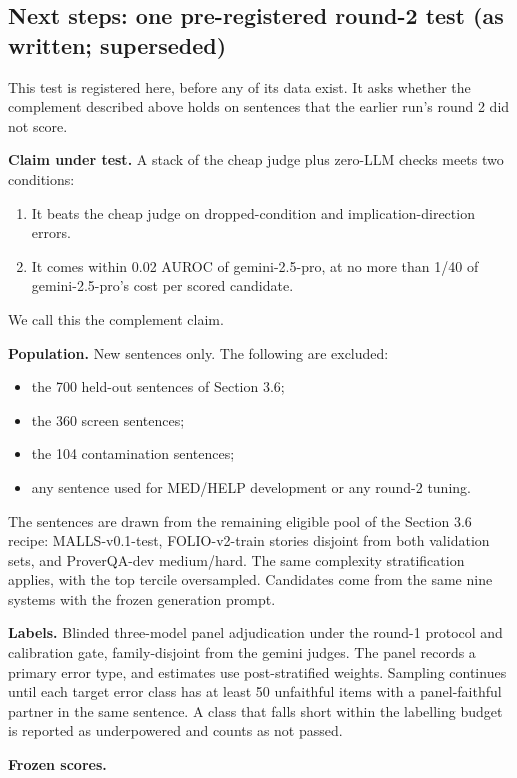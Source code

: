 \documentclass[11pt,letterpaper]{article}
\begin{document}
\subsection{Next steps: one pre-registered round-2 test (as written; superseded)}

This test is registered here, before any of its data exist. It asks whether the complement described above holds on sentences that the earlier run's round 2 did not score.

\textbf{Claim under test.} A stack of the cheap judge plus zero-LLM checks meets two conditions:

\begin{enumerate}
\item {}It beats the cheap judge on dropped-condition and implication-direction errors.
\item {}It comes within 0.02 AUROC of gemini-2.5-pro, at no more than 1/40 of gemini-2.5-pro's cost per scored candidate.
\end{enumerate}
We call this the complement claim.

\textbf{Population.} New sentences only. The following are excluded:

\begin{itemize}
\item {}the 700 held-out sentences of Section 3.6;
\item {}the 360 screen sentences;
\item {}the 104 contamination sentences;
\item {}any sentence used for MED/HELP development or any round-2 tuning.
\end{itemize}
The sentences are drawn from the remaining eligible pool of the Section 3.6 recipe: MALLS-v0.1-test, FOLIO-v2-train stories disjoint from both validation sets, and ProverQA-dev medium/hard. The same complexity stratification applies, with the top tercile oversampled. Candidates come from the same nine systems with the frozen generation prompt.

\textbf{Labels.} Blinded three-model panel adjudication under the round-1 protocol and calibration gate, family-disjoint from the gemini judges. The panel records a primary error type, and estimates use post-stratified weights. Sampling continues until each target error class has at least 50 unfaithful items with a panel-faithful partner in the same sentence. A class that falls short within the labelling budget is reported as underpowered and counts as not passed.

\textbf{Frozen scores.}
\end{document}
